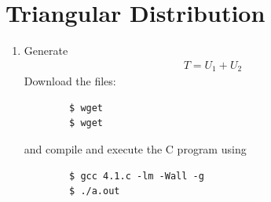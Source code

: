 \documentclass[journal,12pt,twocolumn]{IEEEtran}
\renewcommand\thesection{\arabic{section}}
\begin{document}
\section{Triangular Distribution }
\begin{enumerate}[label=\thesection.\arabic*.,ref=\thesection.\theenumi]
    
    \item Generate 
    \begin{align}
        T=U_1+U_2
    \end{align} 
    \solution Download the files:
    \begin{lstlisting}
        $ wget
        $ wget
    \end{lstlisting}
    and compile and execute the C program using
    \begin{lstlisting}
        $ gcc 4.1.c -lm -Wall -g
        $ ./a.out
    \end{lstlisting}
    

\end{enumerate}
\end{document}
